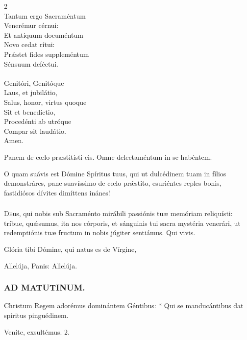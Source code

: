 \documentclass[9pt,twoside]{extarticle}
\begin{document}
\begin{multicols}{2}
\\
Tantum ergo Sacraméntum\\ 
Venerémur cérnui:\\ 
Et antíquum documéntum\\ 
Novo cedat rítui:\\ 
Prǽstet fides suppleméntum\\ 
Sénsuum deféctui.\\ 
\\
Genitóri, Genitóque\\ 
Laus, et jubilátio,\\ 
Salus, honor, virtus quoque\\ 
Sit et benedíctio,\\ 
Procedénti ab utróque\\ 
Compar sit laudátio.\\
Amen.

\begin{tightlist}{}
\item {} Panem de cœlo præstitísti eis.  Omne delectaméntum in se habéntem.
\item {} O quam suávis est Dómine Spíritus tuus, qui ut dulcédinem tuam in fílios demonstráres, pane suavíssimo de cœlo prǽstito, esuriéntes reples bonis, fastidiósos dívites dimíttens inánes!
\end{tightlist}
\subsubsection*{\center {}}
\lettrine{D}eus, qui nobis sub Sacraménto mirábili passiónis tuæ memóriam reliquísti: tríbue, quǽsumus, ita nos córporis, et sánguinis tui sacra mystéria venerári, ut redemptiónis tuæ fructum in nobis júgiter sentiámus. Qui vivis.

\begin{tightlist}{}
\item {} Glória tibi Dómine, qui natus es de Vírgine, 
\item {} Allelúja, Panis:  Allelúja.
\end{tightlist}

\subsubsection*{\center \textsc{AD MATUTINUM.}}
\begin{tightlist}{}
\item {} Christum Regem adorémus dominántem Géntibus: * Qui se manducántibus dat spíritus pinguédinem.
\item {} Veníte, exsultémus. 2.
\end{tightlist}


\end{multicols}
\end{document}
